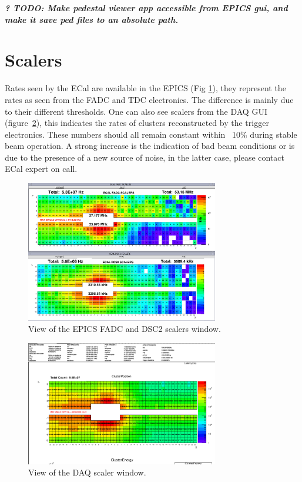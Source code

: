 \documentclass[12pt]{article}
\begin{document}
{\bf\it ? TODO: Make pedestal viewer app accessible from EPICS gui, and make it save ped files to an absolute path.}

      \section{Scalers}

         Rates seen by the ECal are available in the EPICS (Fig \ref{Scalers}), they represent the rates as seen from the FADC and TDC electronics. The difference is mainly due to their different thresholds. One can also see scalers from the DAQ GUI (figure~\ref{DAQscalers}), this indicates the rates of clusters reconstructed by the trigger electronics. These numbers should all remain constant within ~10\% during stable beam operation. A strong increase is the indication of bad beam conditions or is due to the presence of a new source of noise, in the latter case, please contact ECal expert on call.

\begin{figure}[hbp]
\center
\includegraphics[width=0.75\textwidth]{pics/ECAL_FADC_SCALER_2014_12_20.png}
\caption{\small \label{Scalers} View of the EPICS FADC and DSC2 scalers window.}
\end{figure}

\begin{figure}[hbp]
\center
\includegraphics[width=0.75\textwidth]{pics/ecal-cluster-12-20-14.png}
\caption{\small \label{DAQscalers} View of the DAQ scaler window.}
\end{figure}
\end{document}
